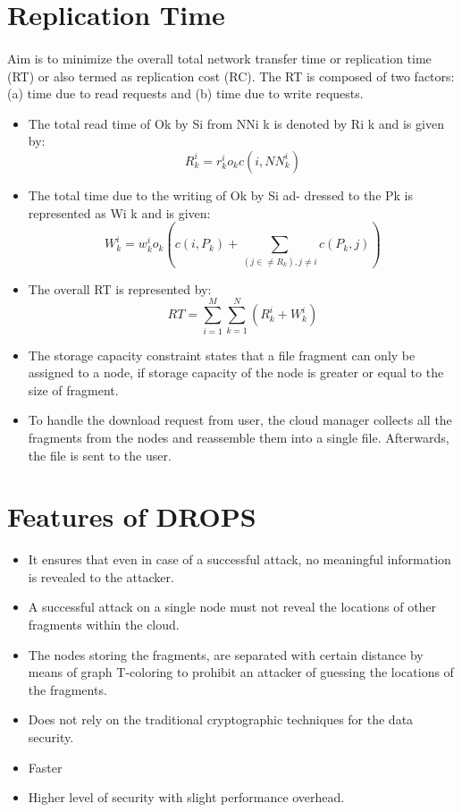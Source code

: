 \section{Replication Time}
\paragraph*{}
Aim is to minimize the overall total network transfer time or replication time (RT)
or also termed as replication cost (RC). The RT is composed of two factors: (a) time due
to read requests and (b) time due to write requests.

\begin{itemize}
	\item The total read time of Ok by Si from NNi k is denoted by Ri k and is given by:
	$$ R_{k}^{i} = r_{k}^{i}o_{k}c(i , N N_{k}^{i})$$
	\item The total time due to the writing of Ok by Si ad- dressed to the Pk is represented as Wi
	k and is given:
	\[
	W_{k}^{i} = w_{k}^{i}o_{k}(c(i, P_{k})+ \sum_{ (j \in\neq R_{k}) , j \neq i} c(P_{k}, j))
	\]
	\item The overall RT is represented by:
	\[
	RT = \sum_{i = 1}^{M} \sum_{ k = 1}^{N} (R_{k}^{i} + W_{k}^{i})
	\]
	\item The storage capacity constraint states that a file fragment can only be assigned to a
	node, if storage capacity of the node is greater or equal to the size of fragment.
	\item To handle the download request from user, the cloud manager collects all the fragments from the nodes and reassemble them into a single file. Afterwards, the file is sent to the
	user.
\end{itemize}
\section{Features of DROPS}
\begin{itemize}
	\item It ensures that even in case of a successful attack, no meaningful information is revealed
	to the attacker.
	\item A successful attack on a single node must not reveal the locations of other fragments
	within the cloud.
	\item The nodes storing the fragments, are separated with certain distance by means of graph
	T-coloring to prohibit an attacker of guessing the locations of the fragments.
	\item Does not rely on the traditional cryptographic techniques for the data security.
	\item Faster
	\item Higher level of security with slight performance overhead.
\end{itemize}